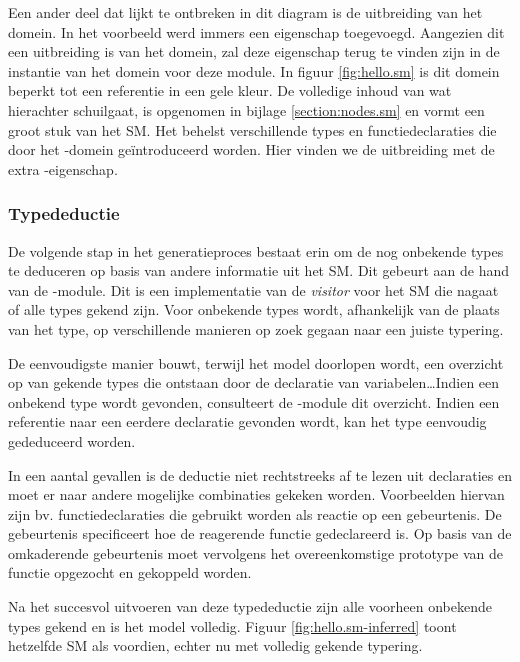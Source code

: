 Een ander deel dat lijkt te ontbreken in dit diagram is de uitbreiding van het
domein. In het voorbeeld werd immers een eigenschap  toegevoegd.
Aangezien dit een uitbreiding is van het domein, zal deze eigenschap terug te
vinden zijn in de instantie van het domein voor deze module. In figuur
\ref{fig:hello.sm} is dit domein beperkt tot een referentie in een gele kleur.
De volledige inhoud van wat hierachter schuilgaat, is opgenomen in bijlage
\ref{section:nodes.sm} en vormt een groot stuk van het SM. Het behelst
verschillende types en functiedeclaraties die door het -domein
ge\"introduceerd worden. Hier vinden we de uitbreiding met de extra
-eigenschap.

\vspace{-3mm}

\subsubsection{Typedeductie}

De volgende stap in het generatieproces bestaat erin om de nog onbekende types
te deduceren op basis van andere informatie uit het SM. Dit gebeurt aan de hand
van de -module. Dit is een implementatie van de \emph{visitor}
voor het SM die nagaat of alle types gekend zijn. Voor onbekende types wordt,
afhankelijk van de plaats van het type, op verschillende manieren op zoek
gegaan naar een juiste typering.

De eenvoudigste manier bouwt, terwijl het model doorlopen wordt, een overzicht
op van gekende types die ontstaan door de declaratie van variabelen\dots Indien
een onbekend type wordt gevonden, consulteert de -module dit
overzicht. Indien een referentie naar een eerdere declaratie gevonden wordt,
kan het type eenvoudig gededuceerd worden.

In een aantal gevallen is de deductie niet rechtstreeks af te lezen uit
declaraties en moet er naar andere mogelijke combinaties gekeken worden.
Voorbeelden hiervan zijn bv. functiedeclaraties die gebruikt worden als reactie
op een gebeurtenis. De gebeurtenis specificeert hoe de reagerende functie
gedeclareerd is. Op basis van de omkaderende gebeurtenis moet vervolgens het
overeenkomstige prototype van de functie opgezocht en gekoppeld worden.

Na het succesvol uitvoeren van deze typedeductie zijn alle voorheen onbekende
types gekend en is het model volledig. Figuur \ref{fig:hello.sm-inferred} toont
hetzelfde SM als voordien, echter nu met volledig gekende typering.

